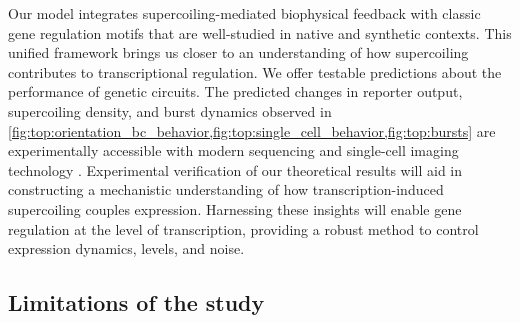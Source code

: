 \documentclass[11pt]{article} %
\begin{document}
Our model integrates supercoiling-mediated biophysical feedback with classic gene regulation motifs that are well-studied in native and synthetic contexts. This unified framework brings us closer to an understanding of how supercoiling contributes to transcriptional regulation. We offer testable predictions about the performance of genetic circuits. The predicted changes in reporter output, supercoiling density, and burst dynamics observed in \cref{fig:top:orientation_bc_behavior,fig:top:single_cell_behavior,fig:top:bursts} are experimentally accessible with modern sequencing and single-cell imaging technology \parencite{guoHighresolutionGenomewideMapping2021,mellorInterleavedGenome2016,patelDNASupercoilingRestricts2022}. Experimental verification of our theoretical results will aid in constructing a mechanistic understanding of how transcription-induced supercoiling couples expression. Harnessing these insights will enable gene regulation at the level of transcription, providing a robust method to control expression dynamics, levels, and noise.

\subsection{Limitations of the study}
\end{document}
